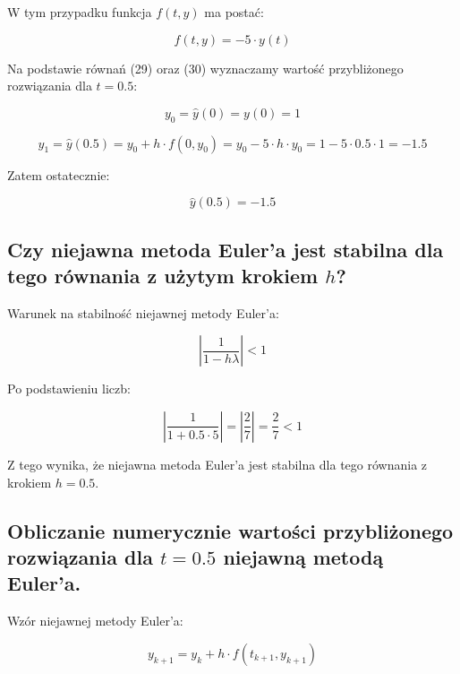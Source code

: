 \documentclass{article}
\begin{document}
	W tym przypadku funkcja $f(t, y)$ ma postać:

	\begin{equation}
		f(t, y) = -5 \cdot y(t)
	\end{equation}

	Na podstawie równań (29) oraz (30) wyznaczamy wartość przybliżonego rozwiązania dla $t = 0.5$:

	\begin{equation}
		y_0 = \hat{y}(0) = y(0) = 1
	\end{equation}

	\begin{equation}
		y_1 = \hat{y}(0.5) = y_0 + h \cdot f(0, y_0) = y_0 - 5 \cdot h \cdot y_0 = 1 - 5 \cdot 0.5 \cdot 1 = -1.5
	\end{equation}

	Zatem ostatecznie:

	\begin{equation}
		\hat{y} (0.5) = -1.5
	\end{equation}


	\subsection*{Czy niejawna metoda Euler'a jest stabilna dla tego równania z użytym krokiem $h$?}

	Warunek na stabilność niejawnej metody Euler'a:

	\begin{equation}
		\left| \frac{1}{1-h \lambda} \right| < 1
	\end{equation}

	Po podstawieniu liczb:

	\begin{equation}
		\left| \frac{1}{1+0.5 \cdot 5} \right| = \left| \frac{2}{7} \right| = \frac{2}{7} < 1
	\end{equation}

	Z tego wynika, że niejawna metoda Euler'a  jest stabilna dla tego równania z krokiem $h = 0.5$.



	\subsection*{Obliczanie numerycznie wartości przybliżonego rozwiązania dla $t = 0.5$ niejawną metodą Euler'a.}

	Wzór niejawnej metody Euler'a:

	\begin{equation}
		y_{k+1} = y_k + h \cdot f(t_{k+1}, y_{k+1})
	\end{equation}
\end{document}
